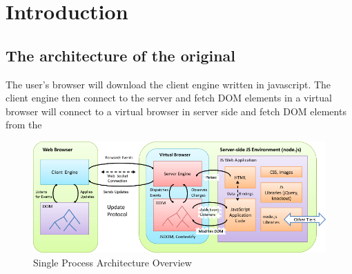 \section{Introduction}
\label{sec:intro}


\subsection{The architecture of the original \cb{}}
The user's browser will download the client engine written in javascript.
The client engine then connect to the server and fetch DOM elements in a
virtual browser
will connect to a virtual browser in server side and fetch DOM
elements from the 


\begin{figure}[h!]
\centering
\includegraphics[width=\textwidth]{figs/cb1_architecture_overview}
\caption{Single Process \cb{} Architecture Overview}
\label{fig:cb1arch}
\end{figure}

